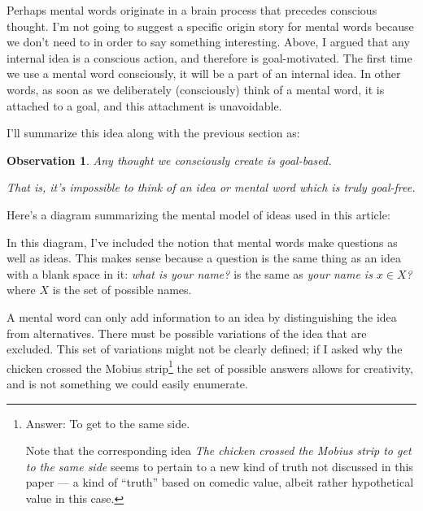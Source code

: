 \documentclass[11pt, oneside]{article}   	%
\newtheorem{obs}{Observation}
\begin{document}
Perhaps mental words originate in a brain process that precedes conscious
thought.
I'm not going to suggest a specific origin story for mental words
because we don't need
to in order to say something interesting.
Above, I argued that any internal idea is a conscious action, and therefore is
goal-motivated. The first time we use a mental word consciously, it will be a
part of an internal idea. In other words, as soon as we deliberately
(consciously) think of a mental word, it is attached to a goal, and this
attachment is unavoidable.

I'll summarize this idea along with the previous section as:
\begin{obs}\label{o4}
    Any thought we consciously create is goal-based.

    \medskip

    That is, it's impossible to think of an idea or mental word which is
    truly goal-free.
\end{obs}

Here's a diagram summarizing the mental model of ideas used in this
article:

\begin{center}
%
\end{center}

In this diagram, I've included the notion that mental words make questions as
well as ideas. This makes sense because a question is the same thing as an idea
with a blank space in it: {\em what is your name?} is the same as
{\em your name is $x\in X$?} where $X$ is the set of possible names.

A mental word can only add information to an idea by distinguishing the idea
from alternatives.
There must be possible variations of the idea that are excluded.
This set of variations might not be clearly defined;
if I asked why the chicken crossed the Mobius strip\footnote{Answer: To
get to the same side.\par Note that the corresponding idea {\em The chicken
crossed the Mobius strip to get to the same side} seems to pertain to a new
kind of truth not discussed in this paper ---
a kind of ``truth'' based on comedic
value, albeit rather hypothetical value in this case.}
the set of possible answers allows for creativity, and is not something we could
easily enumerate.
\end{document}
